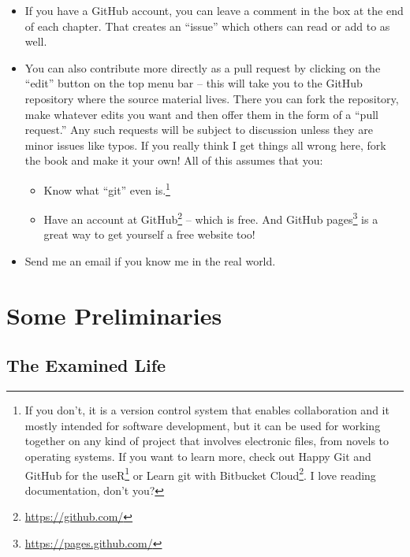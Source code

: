 \documentclass[12pt, openany]{book}
\providecommand{\tightlist}{%
  \setlength{\itemsep}{0pt}\setlength{\parskip}{0pt}}
\renewcommand{\href}[2]{#2\footnote{\url{#1}}}
\begin{document}
\begin{itemize}
\tightlist
\item
  If you have a GitHub account, you can leave a comment in the box at the end of each chapter. That creates an ``issue'' which others can read or add to as well.
\item
  You can also contribute more directly as a pull request by clicking on the ``edit'' button on the top menu bar -- this will take you to the GitHub repository where the source material lives. There you can fork the repository, make whatever edits you want and then offer them in the form of a ``pull request.'' Any such requests will be subject to discussion unless they are minor issues like typos. If you really think I get things all wrong here, fork the book and make it your own! All of this assumes that you:

  \begin{itemize}
  \tightlist
  \item
    Know what ``git'' even is.\footnote{If you don't, it is a version control system that enables collaboration and it mostly intended for software development, but it can be used for working together on any kind of project that involves electronic files, from novels to operating systems. If you want to learn more, check out \href{https://happygitwithr.com/}{Happy Git and GitHub for the useR} or \href{https://www.atlassian.com/git/tutorials/learn-git-with-bitbucket-cloud}{Learn git with Bitbucket Cloud}. I love reading documentation, don't you?}
  \item
    Have an account at \href{https://github.com/}{GitHub} -- which is free. And \href{https://pages.github.com/}{GitHub pages} is a great way to get yourself a free website too!
  \end{itemize}
\item
  Send me an email if you know me in the real world.
\end{itemize}

\hypertarget{part-some-preliminaries}{%
\part{Some Preliminaries}\label{part-some-preliminaries}}

\hypertarget{the-examined-life}{%
\chapter{The Examined Life}\label{the-examined-life}}
\end{document}
